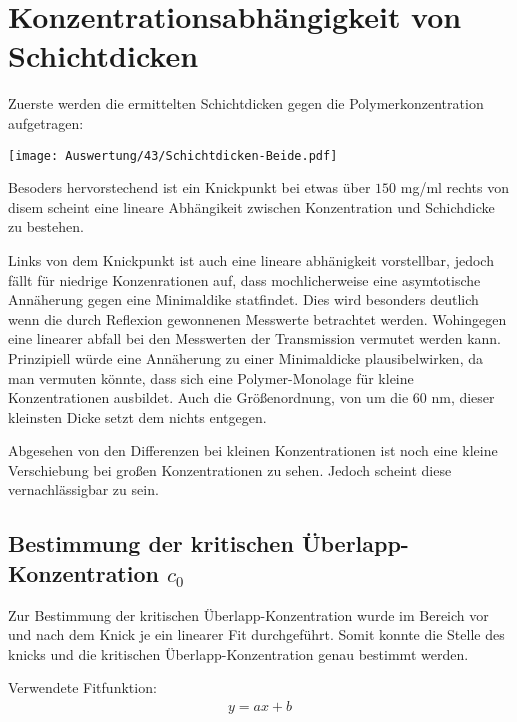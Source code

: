 
\newpage
\section{Konzentrationsabhängigkeit von Schichtdicken}
\label{sec:konzDicke}
Zuerste werden die ermittelten Schichtdicken gegen die Polymerkonzentration aufgetragen:

\begin{center}
	\captionsetup{type=figure}
	\texttt{[image: Auswertung/43/Schichtdicken-Beide.pdf]}
	\label{fig:fitgueteReflexion}
\end{center}

Besoders hervorstechend ist ein Knickpunkt bei etwas über $150$ mg/ml rechts von disem scheint eine lineare Abhängikeit zwischen Konzentration und Schichdicke zu bestehen.

Links von dem Knickpunkt ist auch eine lineare abhänigkeit vorstellbar, jedoch fällt für niedrige Konzenrationen auf, dass mochlicherweise eine asymtotische Annäherung gegen eine Minimaldike statfindet. Dies wird besonders deutlich wenn die durch Reflexion gewonnenen Messwerte betrachtet werden. Wohingegen eine linearer abfall bei den Messwerten der Transmission vermutet werden kann. Prinzipiell würde eine Annäherung zu einer Minimaldicke plausibelwirken, da man vermuten könnte, dass sich eine Polymer-Monolage für kleine Konzentrationen ausbildet. Auch die Größenordnung, von um die $60$ nm, dieser kleinsten Dicke setzt dem nichts entgegen.

Abgesehen von den Differenzen bei kleinen Konzentrationen ist noch eine kleine Verschiebung bei großen Konzentrationen zu sehen. Jedoch scheint diese vernachlässigbar zu sein.


\newpage
\subsection{Bestimmung der kritischen Überlapp-Konzentration $c_0$}

Zur Bestimmung der kritischen Überlapp-Konzentration wurde im Bereich vor und nach dem Knick je ein linearer Fit durchgeführt. Somit konnte die Stelle des knicks und die kritischen Überlapp-Konzentration genau bestimmt werden.

Verwendete Fitfunktion:
\begin{gather}
	y = ax + b
\end{gather}

